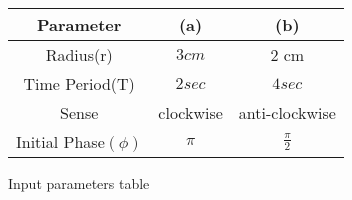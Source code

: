 \centering
\begin{tabular}{|c|c|c|}
        \hline
        \textbf{Parameter} & \textbf{(a)} & \textbf{(b)} \\
        \hline
	Radius(r) & $3 cm$ & 2 cm \\
        \hline
	Time Period(T) & $2 sec$ & $4 sec$ \\
	\hline
	Sense & clockwise & anti-clockwise\\
	\hline
	Initial Phase$(\phi)$ & $\pi$ & $\frac{\pi}{2}$ \\
	\hline
\end{tabular}
\caption{Input parameters table}
\label{tab:11.14.11}
